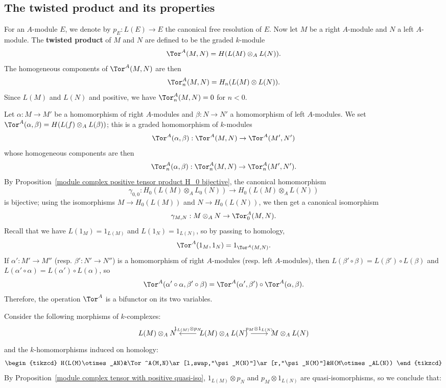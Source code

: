 \subsection{The twisted product and its properties}
For an $A$-module $E$, we denote by $p_E:L(E)\to E$ the canonical free resolution of $E$. Now let $M$ be a right $A$-module and $N$ a left $A$-module. The \textbf{twisted product} of $M$ and $N$ are defined to be the graded $k$-module
\[\Tor^A(M,N)=H(L(M)\otimes_AL(N)).\]
The homogeneous components of $\Tor^A(M,N)$ are then
\[\Tor_n^A(M,N)=H_n(L(M)\otimes L(N)).\]
Since $L(M)$ and $L(N)$ and positive, we have $\Tor_n^A(M,N)=0$ for $n<0$. \par
Let $\alpha:M\to M'$ be a homomorphism of right $A$-modules and $\beta:N\to N'$ a homomorphism of left $A$-modules. We set $\Tor^A(\alpha,\beta)=H(L(f)\otimes_AL(\beta))$; this is a graded homomorphism of $k$-modules
\[\Tor^A(\alpha,\beta):\Tor^A(M,N)\to\Tor^A(M',N')\]
whose homogeneous components are then
\[\Tor_n^A(\alpha,\beta):\Tor^A_n(M,N)\to\Tor_n^A(M',N').\]
By Proposition~\ref{module complex positive tensor product H_0 bijective}, the canonical homomorphism
\[\gamma_{0,0}:H_0(L(M)\otimes_AL_0(N))\to H_0(L(M)\otimes_AL(N))\]
is bijective; using the isomorphisms $M\to H_0(L(M))$ and $N\to H_0(L(N))$, we then get a canonical isomorphism
\[\gamma_{M,N}:M\otimes_AN\to\Tor_0^A(M,N).\]
Recall that we have $L(1_M)=1_{L(M)}$ and $L(1_N)=1_{L(N)}$, so by passing to homology,
\[\Tor^A(1_M,1_N)=1_{\Tor^A(M,N)}.\]
If $\alpha':M'\to M''$ (resp. $\beta':N'\to N''$) is a homomorphism of right $A$-modules (resp. left $A$-modules), then $L(\beta'\circ\beta)=L(\beta')\circ L(\beta)$ and $L(\alpha'\circ\alpha)=L(\alpha')\circ L(\alpha)$, so
\[\Tor^A(\alpha'\circ\alpha,\beta'\circ\beta)=\Tor^A(\alpha',\beta')\circ\Tor^A(\alpha,\beta).\]
Therefore, the operation $\Tor^A$ is a bifunctor on its two variables.\par
Consider the following morphisms of $k$-complexes:
\[\begin{tikzcd}
L(M)\otimes_AN&L(M)\otimes_AL(N)\ar[l,swap,"1_{L(M)}\otimes p_N"]\ar[r,"p_M\otimes 1_{L(N)}"]&M\otimes_AL(N)
\end{tikzcd}\]
and the $k$-homomorphisms induced on homology:
\[\begin{tikzcd}
H(L(M)\otimes_AN)&\Tor^A(M,N)\ar[l,swap,"\psi_M(N)"]\ar[r,"\psi_N(M)"]&H(M\otimes_AL(N))
\end{tikzcd}\]
By Proposition~\ref{module complex tensor with positive quasi-iso}, $1_{L(M)}\otimes p_N$ and $p_M\otimes 1_{L(N)}$ are quasi-isomorphisms, so we conclude that:
